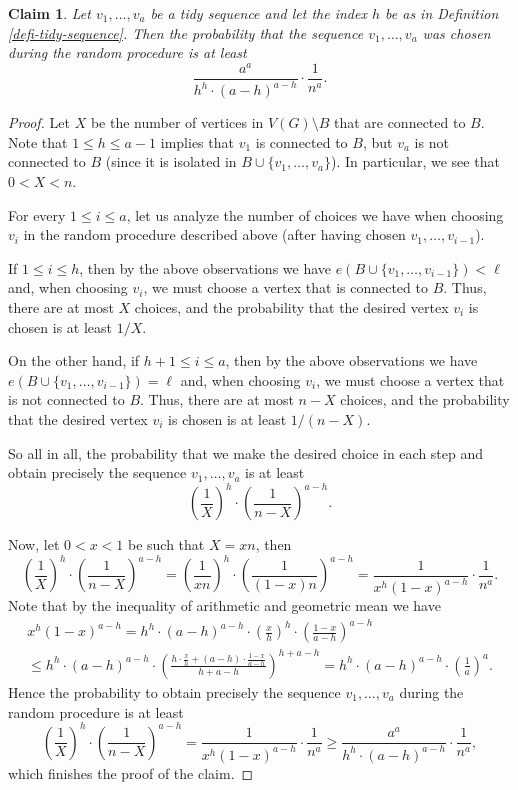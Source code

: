 \documentclass[11pt]{article}
\newtheorem{claim}[theorem]{Claim}
\theoremstyle{definition}
\numberwithin{equation}{section}
\begin{document}
\begin{claim}\label{claim-prob-tidy-seq} Let $v_1,\dots,v_a$ be a tidy sequence and let the index $h$ be as in Definition \ref{defi-tidy-sequence}. Then the probability that the sequence $v_1,\dots,v_a$ was chosen during the random procedure is at least
\[\frac{a^a}{h^h\cdot (a-h)^{a-h}}\cdot \frac{1}{n^a}.\]
\end{claim}
\begin{proof}
Let $X$ be the number of vertices in $V(G)\setminus B$ that are connected to $B$. Note that $1\leq h\leq a-1$ implies that $v_1$ is connected to $B$, but $v_{a}$ is not connected to $B$ (since it is isolated in $B\cup \lbrace v_1,\dots,v_a\rbrace$). In particular, we see that $0<X<n$.

For every $1\leq i\leq a$, let us analyze the number of choices we have when choosing $v_i$ in the random procedure described above (after having chosen $v_1,\dots,v_{i-1}$).

If $1\leq i\leq h$, then by the above observations we have $e(B\cup \lbrace v_1,\dots,v_{i-1}\rbrace)<\ell$ and, when choosing $v_i$, we must choose a vertex that is connected to $B$. Thus, there are at most $X$ choices, and the probability that the desired vertex $v_i$ is chosen is at least $1/X$.

On the other hand, if $h+1\leq i\leq a$, then by the above observations we have $e(B\cup \lbrace v_1,\dots,v_{i-1}\rbrace)=\ell$ and, when choosing $v_i$, we must choose a vertex that is not connected to $B$. Thus, there are at most $n-X$ choices, and the probability that the desired vertex $v_i$ is chosen is at least $1/(n-X)$.

So all in all, the probability that we make the desired choice in each step and obtain precisely the sequence $v_1,\dots,v_a$ is at least
\[\left(\frac{1}{X}\right)^h\cdot \left(\frac{1}{n-X}\right)^{a-h}.\]

Now, let $0<x<1$ be such that $X=xn$, then 
\[\left(\frac{1}{X}\right)^h\cdot \left(\frac{1}{n-X}\right)^{a-h}=\left(\frac{1}{xn}\right)^h\cdot \left(\frac{1}{(1-x)n}\right)^{a-h}=\frac{1}{x^h(1-x)^{a-h}}\cdot \frac{1}{n^a}.\]
Note that by the inequality of arithmetic and geometric mean we have
\begin{multline*}
x^h(1-x)^{a-h}=h^h\cdot (a-h)^{a-h}\cdot\left(\frac{x}{h}\right)^h\cdot\left(\frac{1-x}{a-h}\right)^{a-h}\\
\leq h^h\cdot (a-h)^{a-h}\cdot\left(\frac{h\cdot \frac{x}{h}+(a-h)\cdot \frac{1-x}{a-h}}{h+a-h}\right)^{h+a-h}=h^h\cdot (a-h)^{a-h}\cdot\left(\frac{1}{a}\right)^{a}.
\end{multline*}
Hence the probability to obtain precisely the sequence $v_1,\dots,v_a$ during the random procedure is at least
\[\left(\frac{1}{X}\right)^h\cdot \left(\frac{1}{n-X}\right)^{a-h}=\frac{1}{x^h(1-x)^{a-h}}\cdot \frac{1}{n^a}\geq \frac{a^a}{h^h\cdot (a-h)^{a-h}}\cdot \frac{1}{n^a},\]
which finishes the proof of the claim.
\end{proof}
\end{document}
